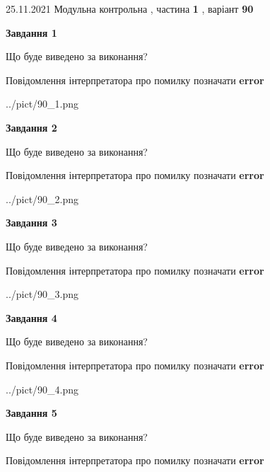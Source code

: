 \documentclass[10pt, ukrainian]{article}
\begin{document}
{25.11.2021 Модульна контрольна , частина \textbf { 1 }, варіант  \No \textbf { 90 }\par}
{
\begin {large}

{\begin {center}\textbf{Завдання 1}\end {center}}\par
Що буде виведено за виконання? \par
Повідомлення інтерпретатора про помилку позначати \textbf{error}

\begin{center}
	{../pict/90_1.png}
\end{center}
\newpage

{\begin {center}\textbf{Завдання 2}\end {center}}\par
Що буде виведено за виконання? \par
Повідомлення інтерпретатора про помилку позначати \textbf{error}

\begin{center}
	{../pict/90_2.png}
\end{center}
\newpage

{\begin {center}\textbf{Завдання 3}\end {center}}\par
Що буде виведено за виконання? \par
Повідомлення інтерпретатора про помилку позначати \textbf{error}

\begin{center}
	{../pict/90_3.png}
\end{center}
\newpage

{\begin {center}\textbf{Завдання 4}\end {center}}\par
Що буде виведено за виконання? \par
Повідомлення інтерпретатора про помилку позначати \textbf{error}

\begin{center}
	{../pict/90_4.png}
\end{center}
\newpage

{\begin {center}\textbf{Завдання 5}\end {center}}\par
Що буде виведено за виконання? \par
Повідомлення інтерпретатора про помилку позначати \textbf{error}


\end{large}}
\end{document}
